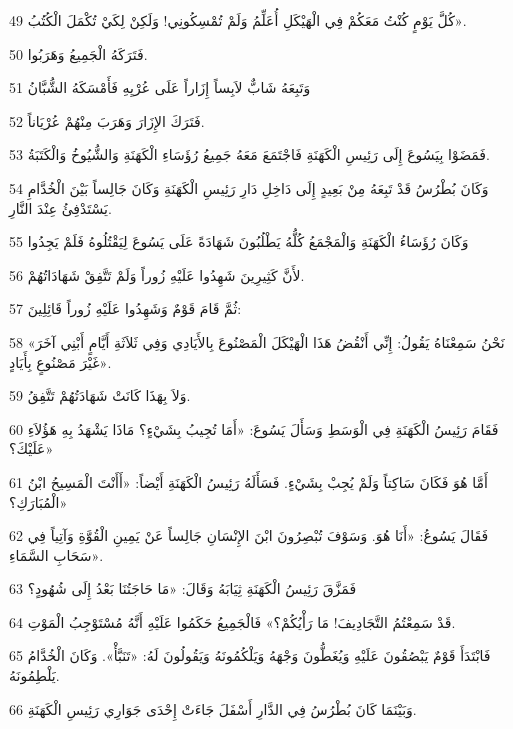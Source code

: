 \par 49 كُلَّ يَوْمٍ كُنْتُ مَعَكُمْ فِي الْهَيْكَلِ أُعَلِّمُ وَلَمْ تُمْسِكُونِي! وَلَكِنْ لِكَيْ تُكْمَلَ الْكُتُبُ».
\par 50 فَتَرَكَهُ الْجَمِيعُ وَهَرَبُوا.
\par 51 وَتَبِعَهُ شَابٌّ لاَبِساً إِزَاراً عَلَى عُرْيِهِ فَأَمْسَكَهُ الشُّبَّانُ
\par 52 فَتَرَكَ الإِزَارَ وَهَرَبَ مِنْهُمْ عُرْيَاناً.
\par 53 فَمَضَوْا بِيَسُوعَ إِلَى رَئِيسِ الْكَهَنَةِ فَاجْتَمَعَ مَعَهُ جَمِيعُ رُؤَسَاءِ الْكَهَنَةِ وَالشُّيُوخُ وَالْكَتَبَةُ.
\par 54 وَكَانَ بُطْرُسُ قَدْ تَبِعَهُ مِنْ بَعِيدٍ إِلَى دَاخِلِ دَارِ رَئِيسِ الْكَهَنَةِ وَكَانَ جَالِساً بَيْنَ الْخُدَّامِ يَسْتَدْفِئُ عِنْدَ النَّارِ.
\par 55 وَكَانَ رُؤَسَاءُ الْكَهَنَةِ وَالْمَجْمَعُ كُلُّهُ يَطْلُبُونَ شَهَادَةً عَلَى يَسُوعَ لِيَقْتُلُوهُ فَلَمْ يَجِدُوا
\par 56 لأَنَّ كَثِيرِينَ شَهِدُوا عَلَيْهِ زُوراً وَلَمْ تَتَّفِقْ شَهَادَاتُهُمْ.
\par 57 ثُمَّ قَامَ قَوْمٌ وَشَهِدُوا عَلَيْهِ زُوراً قَائِلِينَ:
\par 58 «نَحْنُ سَمِعْنَاهُ يَقُولُ: إِنِّي أَنْقُضُ هَذَا الْهَيْكَلَ الْمَصْنُوعَ بِالأَيَادِي وَفِي ثَلاَثَةِ أَيَّامٍ أَبْنِي آخَرَ غَيْرَ مَصْنُوعٍ بِأَيَادٍ».
\par 59 وَلاَ بِهَذَا كَانَتْ شَهَادَتُهُمْ تَتَّفِقُ.
\par 60 فَقَامَ رَئِيسُ الْكَهَنَةِ فِي الْوَسَطِ وَسَأَلَ يَسُوعَ: «أَمَا تُجِيبُ بِشَيْءٍ؟ مَاذَا يَشْهَدُ بِهِ هَؤُلاَءِ عَلَيْكَ؟»
\par 61 أَمَّا هُوَ فَكَانَ سَاكِتاً وَلَمْ يُجِبْ بِشَيْءٍ. فَسَأَلَهُ رَئِيسُ الْكَهَنَةِ أَيْضاً: «أَأَنْتَ الْمَسِيحُ ابْنُ الْمُبَارَكِ؟»
\par 62 فَقَالَ يَسُوعُ: «أَنَا هُوَ. وَسَوْفَ تُبْصِرُونَ ابْنَ الإِنْسَانِ جَالِساً عَنْ يَمِينِ الْقُوَّةِ وَآتِياً فِي سَحَابِ السَّمَاءِ».
\par 63 فَمَزَّقَ رَئِيسُ الْكَهَنَةِ ثِيَابَهُ وَقَالَ: «مَا حَاجَتُنَا بَعْدُ إِلَى شُهُودٍ؟
\par 64 قَدْ سَمِعْتُمُ التَّجَادِيفَ! مَا رَأْيُكُمْ؟» فَالْجَمِيعُ حَكَمُوا عَلَيْهِ أَنَّهُ مُسْتَوْجِبُ الْمَوْتِ.
\par 65 فَابْتَدَأَ قَوْمٌ يَبْصُقُونَ عَلَيْهِ وَيُغَطُّونَ وَجْهَهُ وَيَلْكُمُونَهُ وَيَقُولُونَ لَهُ: «تَنَبَّأْ». وَكَانَ الْخُدَّامُ يَلْطِمُونَهُ.
\par 66 وَبَيْنَمَا كَانَ بُطْرُسُ فِي الدَّارِ أَسْفَلَ جَاءَتْ إِحْدَى جَوَارِي رَئِيسِ الْكَهَنَةِ.
